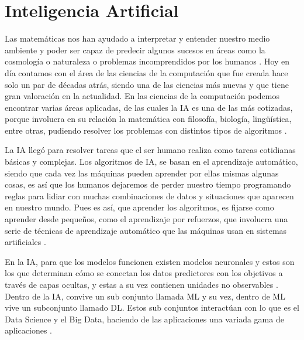 \section{Inteligencia Artificial}
Las matemáticas nos han ayudado a interpretar y entender nuestro medio ambiente y poder ser capaz de predecir algunos sucesos en áreas como la cosmología o naturaleza o problemas incomprendidos por los humanos \cite{Grazia2022}. Hoy en día contamos con el área de las ciencias de la computación que fue creada hace solo un par de décadas atrás, siendo una de las ciencias más nuevas y que tiene gran valoración en la actualidad. En las ciencias de la computación podemos encontrar varias áreas aplicadas, de las cuales la IA es una de las más cotizadas, porque involucra en su relación la matemática con filosofía, biología, lingüística, entre otras, pudiendo resolver los problemas con distintos tipos de algoritmos \cite{Grazia2022}.\\
\par La IA llegó para resolver tareas que el ser humano realiza como tareas cotidianas básicas y complejas. Los algoritmos de IA, se basan en el aprendizaje automático, siendo que cada vez las máquinas pueden aprender por ellas mismas algunas cosas, es así que los humanos dejaremos de perder nuestro tiempo programando reglas para lidiar con muchas combinaciones de datos y situaciones que aparecen en nuestro mundo. Pues es así, que aprender los algoritmos, es fijarse como aprender desde pequeños, como el aprendizaje por refuerzos, que involucra una serie de técnicas de aprendizaje automático que las máquinas usan en sistemas artificiales \cite{Carola}.\\
\par En la IA, para que los modelos funcionen existen modelos neuronales y estos son los que determinan cómo se conectan los datos predictores con los objetivos a través de capas ocultas, y estas a su vez contienen unidades no observables \cite{IBM}. Dentro de la IA, convive un sub conjunto llamada ML y su vez, dentro de ML vive un subconjunto llamado DL. Estos sub conjuntos interactúan con lo que es el Data Science y el Big Data, haciendo de las aplicaciones una variada gama de aplicaciones \cite{moreno2021diseno}.\\


